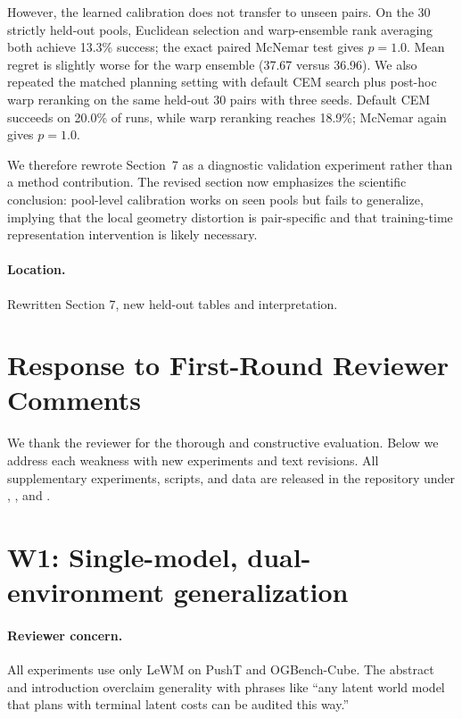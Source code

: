 \documentclass[11pt]{article}
\begin{document}
However, the learned calibration does not transfer to unseen pairs. On the 30 strictly held-out pools, Euclidean selection and warp-ensemble rank averaging both achieve 13.3\% success; the exact paired McNemar test gives $p=1.0$. Mean regret is slightly worse for the warp ensemble (37.67 versus 36.96). We also repeated the matched planning setting with default CEM search plus post-hoc warp reranking on the same held-out 30 pairs with three seeds. Default CEM succeeds on 20.0\% of runs, while warp reranking reaches 18.9\%; McNemar again gives $p=1.0$.

We therefore rewrote Section~7 as a diagnostic validation experiment rather than a method contribution. The revised section now emphasizes the scientific conclusion: pool-level calibration works on seen pools but fails to generalize, implying that the local geometry distortion is pair-specific and that training-time representation intervention is likely necessary.

\paragraph{Location.}
Rewritten Section 7, new held-out tables and interpretation.

\clearpage

\section*{Response to First-Round Reviewer Comments}

We thank the reviewer for the thorough and constructive evaluation. Below we address each weakness with new experiments and text revisions. All supplementary experiments, scripts, and data are released in the repository under , , and .

\section*{W1: Single-model, dual-environment generalization}

\paragraph{Reviewer concern.}
All experiments use only LeWM on PushT and OGBench-Cube. The abstract and introduction overclaim generality with phrases like ``any latent world model that plans with terminal latent costs can be audited this way.''
\end{document}
